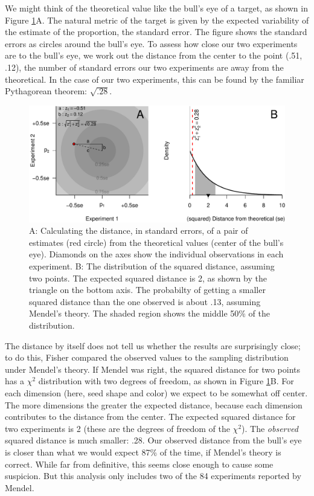 \documentclass[english,floatsintext,man]{apa6}
\theoremstyle{definition}
\theoremstyle{definition}
\theoremstyle{definition}
\theoremstyle{remark}
\begin{document}
We might think of the theoretical value like the bull's eye of a target,
as shown in Figure \ref{fig:MendelTarget}A. The natural metric of the
target is given by the expected variability of the estimate of the
proportion, the standard error. The figure shows the standard errors as
circles around the bull's eye. To assess how close our two experiments
are to the bull's eye, we work out the distance from the center to the
point (.51, .12), the number of standard errors our two experiments are
away from the theoretical. In the case of our two experiments, this can
be found by the familiar Pythagorean theorem: \(\sqrt{.28}\).

\begin{figure}
\centering
\includegraphics{paper_pdf_files/figure-latex/MendelTarget-1.pdf}
\caption{\label{fig:MendelTarget}A: Calculating the distance, in standard
errors, of a pair of estimates (red circle) from the theoretical values
(center of the bull's eye). Diamonds on the axes show the individual
observations in each experiment. B: The distribution of the squared
distance, assuming two points. The expected squared distance is 2, as
shown by the triangle on the bottom axis. The probabilty of getting a
smaller squared distance than the one observed is about .13, assuming
Mendel's theory. The shaded region shows the middle 50\% of the
distribution.}
\end{figure}

The distance by itself does not tell us whether the results are
surprisingly close; to do this, Fisher compared the observed values to
the sampling distribution under Mendel's theory. If Mendel was right,
the squared distance for two points has a \(\chi^2\) distribution with
two degrees of freedom, as shown in Figure \ref{fig:MendelTarget}B. For
each dimension (here, seed shape and color) we expect to be somewhat off
center. The more dimensions the greater the expected distance, because
each dimension contributes to the distance from the center. The expected
squared distance for two experiments is 2 (these are the degrees of
freedom of the \(\chi^2\)). The \emph{observed} squared distance is much
smaller: .28. Our observed distance from the bull's eye is closer than
what we would expect 87\% of the time, if Mendel's theory is correct.
While far from definitive, this seems close enough to cause some
suspicion. But this analysis only includes two of the 84 experiments
reported by Mendel.
\end{document}
